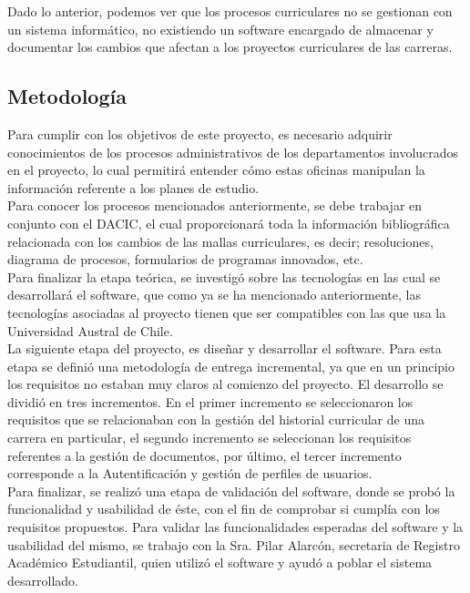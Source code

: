 		
		Dado lo anterior, podemos ver que los procesos curriculares no se gestionan con un sistema informático, no existiendo un software encargado  de almacenar y documentar los cambios que afectan a los proyectos curriculares de las carreras.
		
	
\subsection{Metodología}

Para cumplir con los objetivos de este proyecto, es necesario adquirir conocimientos de los procesos administrativos de los departamentos involucrados en el proyecto, lo cual permitirá entender cómo estas oficinas manipulan la información referente a los planes de estudio.
\\

Para conocer los procesos mencionados anteriormente, se debe trabajar en conjunto con el DACIC, el cual proporcionará toda la información bibliográfica relacionada con los cambios de las mallas curriculares, es decir; resoluciones, diagrama de procesos, formularios de programas innovados, etc.
\\

Para finalizar la etapa teórica, se investigó sobre las tecnologías en las cual se desarrollará el software, que como ya se ha mencionado anteriormente, las tecnologías asociadas al proyecto tienen que ser compatibles con las que usa la Universidad Austral de Chile.
\\


La siguiente etapa del proyecto, es diseñar y desarrollar el software. Para esta etapa se definió una metodología de entrega incremental, ya que en un principio los requisitos no estaban muy claros al comienzo del proyecto. El desarrollo se dividió en tres incrementos. En el primer incremento se seleccionaron los requisitos que se relacionaban con la gestión del historial curricular de una carrera en particular,  el segundo incremento se seleccionan los requisitos referentes a la gestión de documentos, por último, el tercer incremento  corresponde a la Autentificación y gestión de perfiles de usuarios.
\\

Para finalizar, se realizó una etapa de validación del software, donde se probó la funcionalidad y usabilidad de éste, con el fin de comprobar si cumplía con los requisitos propuestos. Para validar las funcionalidades esperadas del software y la usabilidad del mismo, se trabajo con la Sra. Pilar Alarcón, secretaria de Registro Académico Estudiantil, quien utilizó el software y ayudó a poblar el sistema desarrollado.

